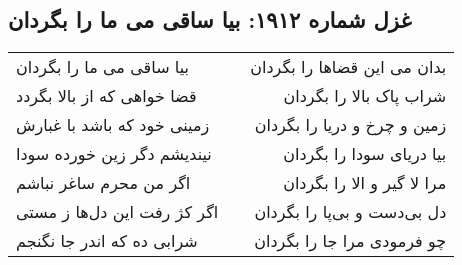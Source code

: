 \begin{center}
\section*{غزل شماره ۱۹۱۲: بیا ساقی می ما را بگردان}
\label{sec:1912}
\begin{longtable}{l p{0.5cm} r}
بیا ساقی می ما را بگردان
&&
بدان می این قضاها را بگردان
\\
قضا خواهی که از بالا بگردد
&&
شراب پاک بالا را بگردان
\\
زمینی خود که باشد با غبارش
&&
زمین و چرخ و دریا را بگردان
\\
نیندیشم دگر زین خورده سودا
&&
بیا دریای سودا را بگردان
\\
اگر من محرم ساغر نباشم
&&
مرا لا گیر و الا را بگردان
\\
اگر کژ رفت این دل‌ها ز مستی
&&
دل بی‌دست و بی‌پا را بگردان
\\
شرابی ده که اندر جا نگنجم
&&
چو فرمودی مرا جا را بگردان
\\
\end{longtable}
\end{center}
